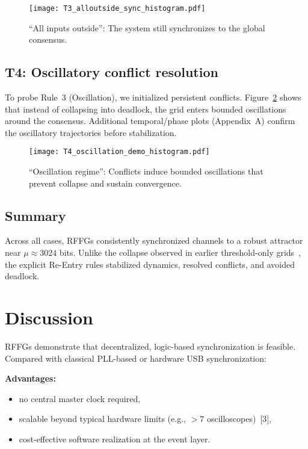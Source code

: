 \documentclass[11pt]{article}
\begin{document}
\begin{figure}[htbp!]
  \centering
  \texttt{[image: T3\_alloutside\_sync\_histogram.pdf]}
  \caption{\enquote{All inputs outside}: The system still synchronizes to the global consensus.}
  \label{fig:T3_hist}
\end{figure}

\subsection*{T4: Oscillatory conflict resolution}
To probe Rule~3 (Oscillation), we initialized persistent conflicts.  
Figure~\ref{fig:T4_hist} shows that instead of collapsing into deadlock, the grid enters bounded oscillations around the consensus. Additional temporal/phase plots (Appendix~A) confirm the oscillatory trajectories before stabilization.

\begin{figure}[htbp!]
  \centering
  \texttt{[image: T4\_oscillation\_demo\_histogram.pdf]}
  \caption{\enquote{Oscillation regime}: Conflicts induce bounded oscillations that prevent collapse and sustain convergence.}
  \label{fig:T4_hist}
\end{figure}

\subsection*{Summary}
Across all cases, RFFGs consistently synchronized channels to a robust attractor near $\mu \approx 3024$ bits. Unlike the collapse observed in earlier threshold-only grids~\cite{lba2025}, the explicit Re-Entry rules stabilized dynamics, resolved conflicts, and avoided deadlock.

\section{Discussion}
RFFGs demonstrate that decentralized, logic-based synchronization is feasible. Compared with classical PLL-based or hardware USB synchronization:

\textbf{Advantages:}
\begin{itemize}
  \item no central master clock required,
  \item scalable beyond typical hardware limits (e.g., $>7$ oscilloscopes)~[3],
  \item cost-effective software realization at the event layer.
\end{itemize}
\end{document}
